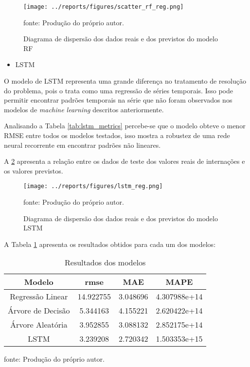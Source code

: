 \documentclass[
  12pt,		%
  a4paper,	%
  openright,%
  oneside,	%
  chapter=TITLE,		%
  section=TITLE,		%
  english,	%
  french,	%
  spanish,	%
  brazil	%
]{abntex2}
\begin{document}
    \begin{figure}[ht]
        \centering
        \caption{Diagrama de dispersão dos dados reais e dos previstos do modelo RF}
        \texttt{[image: ../reports/figures/scatter\_rf\_reg.png]}
        \label{scatter_rf_reg}
        \par
        {\small fonte: Produção do próprio autor.}
    \end{figure}

    \begin{itemize}
        \item LSTM
    \end{itemize}

    O modelo de LSTM representa uma grande diferença no tratamento de resolução do problema, pois o trata
    como uma regressão de séries temporais. Isso pode permitir encontrar padrões temporais na
    série que não foram observados nos modelos de \textit{machine learning} descritos anteriormente.

    Analisando a Tabela \ref*{tab:lstm_metrics} percebe-se que o modelo obteve o menor
    RMSE entre todos os modelos testados, isso mostra a robustez de uma rede neural recorrente
    em encontrar padrões não lineares.

    

    A \ref*{scatter_lstm_reg} apresenta a relação entre os dados de teste dos valores reais de internações e os valores previstos.

    \begin{figure}[ht]
        \centering
        \caption{Diagrama de dispersão dos dados reais e dos previstos do modelo LSTM}
        \texttt{[image: ../reports/figures/lstm\_reg.png]}
        \label{scatter_lstm_reg}
        \par
        {\small fonte: Produção do próprio autor.}
    \end{figure}

    A Tabela \ref*{tabela resultado} apresenta os resultados obtidos para cada um dos modelos:

    \begin{table}[ht]
        \centering
        \caption{Resultados dos modelos}
        \label{tabela resultado}
        \begin{tabular}{cccc}
            \hline
            \multicolumn{1}{|c|}{Modelo} & \multicolumn{1}{c|}{rmse} & \multicolumn{1}{c|}{MAE} & \multicolumn{1}{c|}{MAPE}\\
            \hline
            Regressão Linear & 14.922755 & 3.048696 & 4.307988e+14\\
            Árvore de Decisão & 5.344163 & 4.155221 & 2.620422e+14\\
            Árvore Aleatória & 3.952855 & 3.088132 & 2.852175e+14\\
            LSTM & 3.239208 & 2.720342 & 1.503353e+15\\
            \hline
        \end{tabular}
        \par
        {\small fonte: Produção do próprio autor.}
    \end{table}
\end{document}
